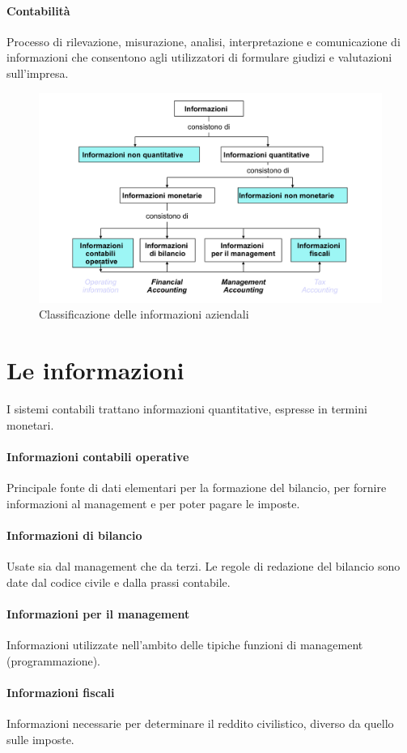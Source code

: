 \documentclass{report}
\begin{document}
	\paragraph{Contabilità} Processo di rilevazione, misurazione, analisi, interpretazione e comunicazione di informazioni che consentono agli utilizzatori di formulare giudizi e valutazioni sull'impresa.
	\begin{figure}[h]
		\centering
		\includegraphics[width=0.7\linewidth]{images/classificazione-informazioni}
		\caption{Classificazione delle informazioni aziendali}
		\label{fig:classificazione-informazioni}
	\end{figure}
	\section{Le informazioni} I sistemi contabili trattano informazioni quantitative, espresse in termini monetari.
	\paragraph{Informazioni contabili operative} Principale fonte di dati elementari per la formazione del bilancio, per fornire informazioni al management e per poter pagare le imposte.
	\paragraph{Informazioni di bilancio} Usate sia dal management che da terzi. Le regole di redazione del bilancio sono date dal codice civile e dalla prassi contabile.
	\paragraph{Informazioni per il management} Informazioni utilizzate nell'ambito delle tipiche funzioni di management (programmazione).
	\paragraph{Informazioni fiscali} Informazioni necessarie per determinare il reddito civilistico, diverso da quello sulle imposte.
\end{document}
